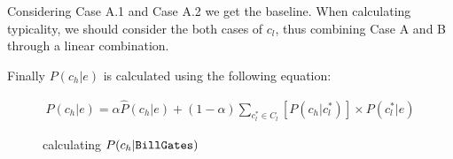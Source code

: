 %

Considering Case A.1 and Case A.2 we get the baseline. When calculating typicality, we should consider the both cases of $c_l$, thus combining Case A and B through a linear combination.

Finally  $P({c_h}|e)$ is calculated using the following equation:

\begin{equation}
\begin{split}
P({c_h}|e) = \alpha \hat{P}({c_h}|e)+ (1-\alpha) \sum_{ c_{l}^*\in C_{l} } [P({c_h}|c_{l}^*) ] \times  P(c_{l}^*|e)
\end{split}
\label{eq:pgge}\end{equation}






\begin{figure*}[!hptb]
\label{fig:pgge}
\centering
{}
\caption{calculating $P({c_h}|{\tt Bill Gates})$ }
\end{figure*}


